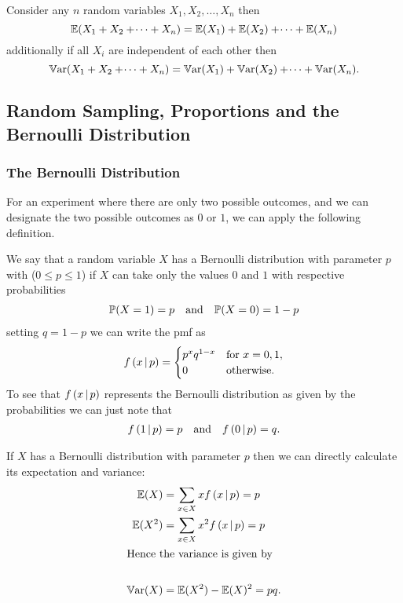 \documentclass[10pt, a4paper]{article}
\begin{document}
Consider any $n$ random variables $X_1, X_2, \dotsc, X_n$ then
\[
\E(X_1 + X_2 + \dotsi + X_n) = \E(X_1) + \E(X_2) + \dotsi + \E(X_n)
\]
additionally if all $X_i$ are independent of each other then
\[
\Var(X_1 + X_2 + \dotsi + X_n) = \Var(X_1) + \Var(X_2) + \dotsi + \Var(X_n).
\]

\subsection{Random Sampling,
Proportions and the Bernoulli Distribution}

\subsubsection{The Bernoulli Distribution}

For an experiment where there are only two possible outcomes,
and we can designate the two possible outcomes as $0$ or $1$,
we can apply the following definition.
\begin{definition}
    We say that a random variable $X$ has a Bernoulli distribution with parameter $p$ with
    ($0 \leq p \leq 1$)
    if $X$ can take only the values $0$ and $1$ with respective probabilities
    \begin{align*}
        \P(X = 1) = p&&\text{and}&&\P(X = 0) = 1 - p
    \end{align*}
    setting $q = 1 - p$ we can write the pmf as
    \[
    f\left(x \mmid p\right) = \begin{cases}
        p ^ xq ^ {1 - x} &\text{for } x = 0, 1, \\
        0 &\text{otherwise}.
    \end{cases}
    \]
    To see that $f\left(x \mmid p\right)$ represents the Bernoulli distribution as given by the probabilities we can just note that
    \begin{align*}
        f\left(1 \mmid p\right) = p &&\text{and}&&f\left(0 \mmid p\right) = q.
    \end{align*}
\end{definition}

If $X$ has a Bernoulli distribution with parameter $p$ then we can directly calculate its expectation and variance:
\begin{align*}
    \E(X) &= \sum_{x \in X}xf\left(x \mmid p\right) = p \\
    \E(X ^ 2) &= \sum_{x \in X}x ^ 2f\left(x \mmid p\right) = p \\
    \intertext{Hence the variance is given by} \\
    \Var(X) &= \E(X ^ 2) - \E(X) ^ 2 = pq.
\end{align*}
\end{document}
